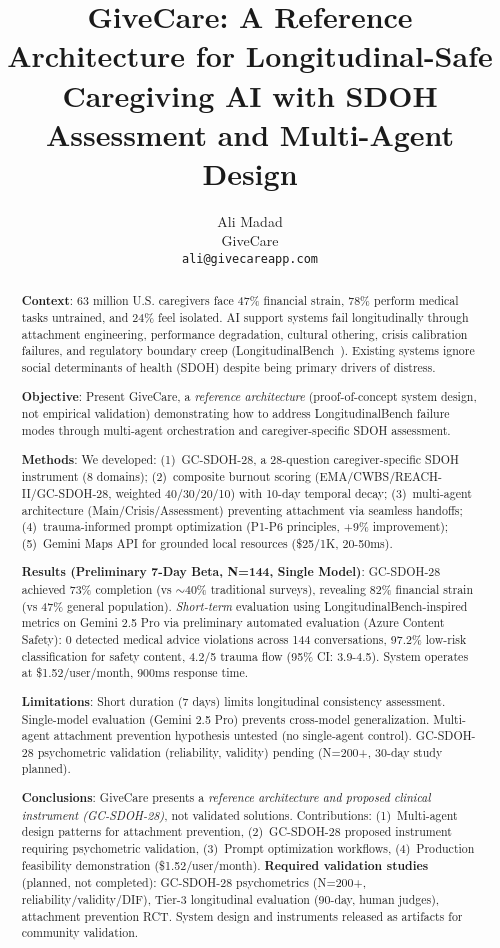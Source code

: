 \documentclass{article}
\title{GiveCare: A Reference Architecture for Longitudinal-Safe Caregiving AI with SDOH Assessment and Multi-Agent Design}
\author{
  Ali Madad \\
  GiveCare \\
  \texttt{ali@givecareapp.com}
}
\begin{document}
%
\maketitle%
\begin{abstract}%
\textbf{Context}: 63 million U.S. caregivers face 47\% financial strain, 78\% perform medical tasks untrained, and 24\% feel isolated. AI support systems fail longitudinally through attachment engineering, performance degradation, cultural othering, crisis calibration failures, and regulatory boundary creep (LongitudinalBench~\cite{longitudinalbench}). Existing systems ignore social determinants of health (SDOH) despite being primary drivers of distress.

\textbf{Objective}: Present GiveCare, a \textit{reference architecture} (proof-of-concept system design, not empirical validation) demonstrating how to address LongitudinalBench failure modes through multi-agent orchestration and caregiver-specific SDOH assessment.

\textbf{Methods}: We developed: (1)~GC-SDOH-28, a 28-question caregiver-specific SDOH instrument (8 domains); (2)~composite burnout scoring (EMA/CWBS/REACH-II/GC-SDOH-28, weighted 40/30/20/10) with 10-day temporal decay; (3)~multi-agent architecture (Main/Crisis/Assessment) preventing attachment via seamless handoffs; (4)~trauma-informed prompt optimization (P1-P6 principles, +9\% improvement); (5)~Gemini Maps API for grounded local resources (\$25/1K, 20-50ms).

\textbf{Results (Preliminary 7-Day Beta, N=144, Single Model)}: GC-SDOH-28 achieved 73\% completion (vs $\sim$40\% traditional surveys), revealing 82\% financial strain (vs 47\% general population). \textit{Short-term} evaluation using LongitudinalBench-inspired metrics on Gemini 2.5 Pro via preliminary automated evaluation (Azure Content Safety): 0 detected medical advice violations across 144 conversations, 97.2\% low-risk classification for safety content, 4.2/5 trauma flow (95\% CI: 3.9-4.5). System operates at \$1.52/user/month, 900ms response time.

\textbf{Limitations}: Short duration (7 days) limits longitudinal consistency assessment. Single-model evaluation (Gemini 2.5 Pro) prevents cross-model generalization. Multi-agent attachment prevention hypothesis untested (no single-agent control). GC-SDOH-28 psychometric validation (reliability, validity) pending (N=200+, 30-day study planned).

\textbf{Conclusions}: GiveCare presents a \textit{reference architecture and proposed clinical instrument (GC-SDOH-28)}, not validated solutions. Contributions: (1)~Multi-agent design patterns for attachment prevention, (2)~GC-SDOH-28 proposed instrument requiring psychometric validation, (3)~Prompt optimization workflows, (4)~Production feasibility demonstration (\$1.52/user/month). \textbf{Required validation studies} (planned, not completed): GC-SDOH-28 psychometrics (N=200+, reliability/validity/DIF), Tier-3 longitudinal evaluation (90-day, human judges), attachment prevention RCT. System design and instruments released as artifacts for community validation.


\end{abstract}
\end{document}
